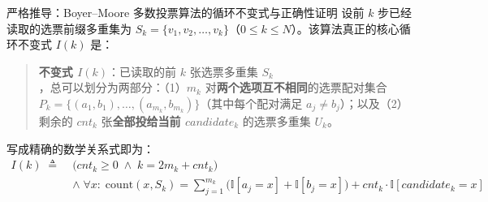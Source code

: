 \documentclass[a4paper]{article}
\begin{document}
\begin{knowledgebox}{严格推导：Boyer--Moore 多数投票算法的循环不变式与正确性证明}
设前 $k$ 步已经读取的选票前缀多重集为 $S_k = \{v_1, v_2, \dots, v_k\}$（$0 \le k \le N$）。该算法真正的核心循环不变式 $I(k)$ 是：
\begin{quote}
\textbf{不变式 $I(k)$}：已读取的前 $k$ 张选票多重集 $S_k$，总可以划分为两部分：（1）$m_k$ 对\textbf{两个选项互不相同}的选票配对集合 $P_k = \{(a_1, b_1), \dots, (a_{m_k}, b_{m_k})\}$（其中每个配对满足 $a_j \neq b_j$）；以及（2）剩余的 $\mathit{cnt}_k$ 张\textbf{全部投给当前 $\mathit{candidate}_k$} 的选票多重集 $U_k$。
\end{quote}
写成精确的数学关系式即为：
\begin{equation}
\begin{aligned}
I(k) \;\triangleq\; &\big(\mathit{cnt}_k \ge 0 \;\land\; k = 2m_k + \mathit{cnt}_k\big) \\
&\land\; \forall x:\; \mathrm{count}(x, S_k) = \sum_{j=1}^{m_k} \big(\mathbb{I}[a_j = x] + \mathbb{I}[b_j = x]\big) + \mathit{cnt}_k \cdot \mathbb{I}[\mathit{candidate}_k = x]
\end{aligned}
\label{eq:boyer_moore_invariant}
\end{equation}


\end{knowledgebox}
\end{document}
